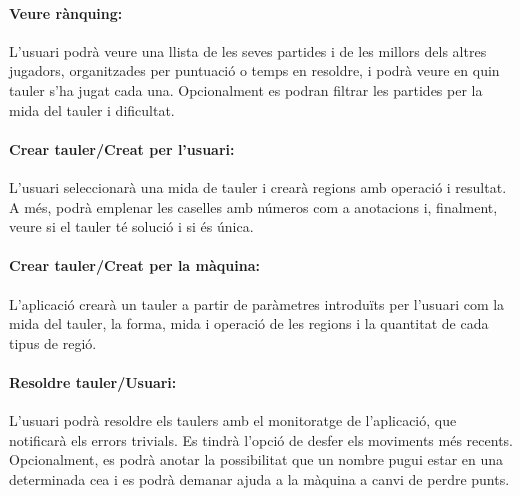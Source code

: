 \documentclass[a4paper,12pt]{article}
\begin{document}
\paragraph{Veure rànquing:} 
L'usuari podrà veure una llista de les seves partides i de les millors dels altres jugadors, organitzades per puntuació o temps en resoldre, i podrà veure en quin tauler s'ha jugat cada una. Opcionalment es podran filtrar les partides per la mida del tauler i dificultat. 

\paragraph{Crear tauler/Creat per l'usuari:}
L'usuari seleccionarà una mida de tauler i crearà regions amb operació i resultat. A més, podrà emplenar les caselles amb números com a anotacions i, finalment, veure si el tauler té solució i si és única.

\paragraph{Crear tauler/Creat per la màquina:}
L'aplicació crearà un tauler a partir de paràmetres introduïts per l'usuari com la mida del tauler, la forma, mida i operació de les regions i la quantitat de cada tipus de regió.

\paragraph{Resoldre tauler/Usuari:}
L'usuari podrà resoldre els taulers amb el monitoratge de l'aplicació, que notificarà els errors trivials. Es tindrà l'opció de desfer els moviments més recents. Opcionalment, es podrà anotar la possibilitat que un nombre pugui estar en una determinada ce\lgem a i es podrà demanar ajuda a la màquina a canvi de perdre punts.

\newpage
\end{document}
